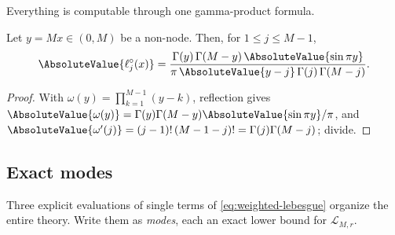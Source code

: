 \documentclass[11pt,oneside]{article}
\numberwithin{equation}{section}
\theoremstyle{definition}
\theoremstyle{remark}
\newcommand{\Leb}{\mathscr L}
\begin{document}
Everything is computable through one gamma-product formula.

\begin{lemma}
\label{lem:gamma-cardinal}
Let $y=Mx\in(0,M)$ be a non-node.  Then, for $1\le j\le M-1$,
\begin{equation}
 \AbsoluteValue{\ell^{\circ}_j(x)}
 =\frac{\Gamma(y)\,\Gamma(M-y)\,\AbsoluteValue{\sin\pi y}}
 {\pi\,\AbsoluteValue{y-j}\,\Gamma(j)\,\Gamma(M-j)}.
 \label{eq:gamma-cardinal}
\end{equation}
\end{lemma}

\begin{proof}
With $\omega(y)=\prod_{k=1}^{M-1}(y-k)$, reflection gives
$\AbsoluteValue{\omega(y)}=\Gamma(y)\Gamma(M-y)\AbsoluteValue{\sin\pi y}/\pi$, and
$\AbsoluteValue{\omega'(j)}=(j-1)!\,(M-1-j)!=\Gamma(j)\Gamma(M-j)$; divide.
\end{proof}

\subsection{Exact modes}

Three explicit evaluations of single terms of
\eqref{eq:weighted-lebesgue} organize the entire theory.  Write them
as \emph{modes}, each an exact lower bound for $\Leb_{M,r}$.
\end{document}
